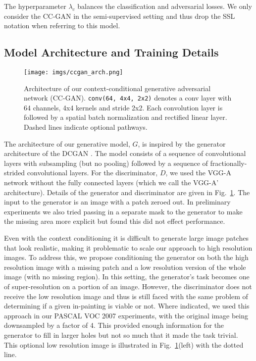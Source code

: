 \documentclass{article} \usepackage{iclr2017_conference,times}
\newcommand{\fig}[1]{Fig.~\ref{fig:#1}}
\begin{document}
The hyperparameter $\lambda_c$ balances the classification and adversarial losses. 
We only consider the CC-GAN in the semi-supervised setting and thus drop the SSL notation when referring to this model. 

\subsection{Model Architecture and Training Details}

\begin{figure}[t]
\centering
 \texttt{[image: imgs/ccgan\_arch.png]} 
\caption{ Architecture of our context-conditional generative adversarial network (CC-GAN). \texttt{conv(64, 4x4, 2x2)} denotes a conv layer with 64 channels, 4x4 kernels and stride 2x2. Each convolution layer is followed by a spatial batch normalization and rectified linear layer. Dashed lines indicate optional pathways.
}
\vspace{-0.7em}
\label{fig:network}
\end{figure}

The architecture of our generative model, $G$, is inspired by the
generator architecture of the DCGAN \citep{radford2016}.  The model
consists of a sequence of convolutional layers with subsampling (but
no pooling) followed by a sequence of fractionally-strided
convolutional layers.  For the discriminator, $D$, we used the VGG-A
network \citep{vgg} without the fully connected layers (which we call
the VGG-A' architecture). Details of the
generator and discriminator are given in \fig{network}. The input to the generator is an image with a patch zeroed out. In preliminary
experiments we also tried passing in a separate mask to the generator
to make the missing area more explicit but found this did not effect
performance.

Even with the context conditioning it is difficult to generate large
image patches that look realistic, making it problematic to scale our
approach to high resolution images.  To address this, we propose
conditioning the generator on both the high resolution image with a
missing patch and a low resolution version of the whole image (with no
missing region).  
In this setting, the generator’s task becomes one of super-resolution on a portion of an image. 
However, the discriminator does not receive the low resolution image and thus is still faced with the same problem of determining if a given in-painting is viable or not. 
Where indicated, we used this approach in our PASCAL VOC 2007
experiments, with the original image being downsampled by a
factor of 4.  This provided enough information for the generator to
fill in larger holes but not so much that it made the task trivial.
This optional low resolution image is illustrated in
\fig{network}(left) with the dotted line.
\end{document}
